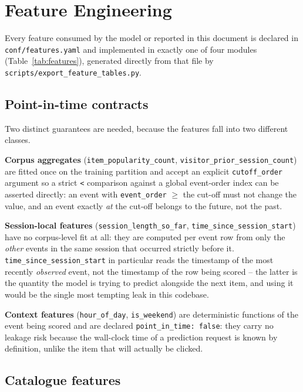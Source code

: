 \section{Feature Engineering}
\label{sec:features}

Every feature consumed by the model or reported in this document is declared
in \texttt{conf/features.yaml} and implemented in exactly one of four modules
(Table~\ref{tab:features}), generated directly from that file by
\texttt{scripts/export\_feature\_tables.py}.

\subsection{Point-in-time contracts}

Two distinct guarantees are needed, because the features fall into two
different classes.

\textbf{Corpus aggregates} (\texttt{item\_popularity\_count},
\texttt{visitor\_prior\_session\_count}) are fitted once on the training
partition and accept an explicit \texttt{cutoff\_order} argument so a strict
\texttt{<} comparison against a global event-order index can be asserted
directly: an event with \texttt{event\_order} $\geq$ the cut-off must not
change the value, and an event exactly \emph{at} the cut-off belongs to the
future, not the past.

\textbf{Session-local features}
(\texttt{session\_length\_so\_far}, \texttt{time\_since\_session\_start}) have
no corpus-level fit at all: they are computed per event row from only the
\emph{other} events in the same session that occurred strictly before it.
\texttt{time\_since\_session\_start} in particular reads the timestamp of the
most recently \emph{observed} event, not the timestamp of the row being
scored -- the latter is the quantity the model is trying to predict alongside
the next item, and using it would be the single most tempting leak in this
codebase.

\textbf{Context features} (\texttt{hour\_of\_day}, \texttt{is\_weekend}) are
deterministic functions of the event being scored and are declared
\texttt{point\_in\_time: false}: they carry no leakage risk because the
wall-clock time of a prediction request is known by definition, unlike the
item that will actually be clicked.

\subsection{Catalogue features}

